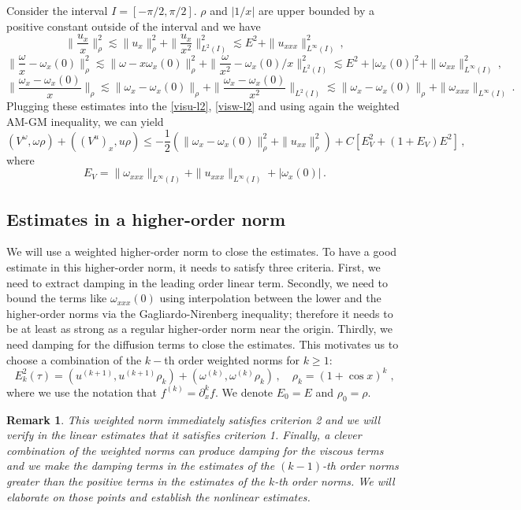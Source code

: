 \documentclass[12pt]{caltech_thesis}
\newtheorem{remark}[theorem]{Remark}
\numberwithin{equation}{section}
\begin{document}
   Consider the interval $I=[-\pi/2,\pi/2]$. $\rho$ and $|1/x|$ are upper bounded by a positive constant outside of the interval and we have $$\|\frac{u_x}{x}\|_{\rho}^2\lesssim \|{u_x}\|_{\rho}^2+\|\frac{u_x}{x^2}\|_{L^2(I)}^2\lesssim E^2+\|u_{xxx}\|_{L^\infty(I)}^2\,,$$
   $$\|\frac{\omega}{x}-\omega_{x}(0)\|_{\rho}^2\lesssim \|\omega-x\omega_{x}(0)\|_{\rho}^2+\|\frac{\omega}{x^2}-\omega_{x}(0)/x\|_{L^2(I)}^2\lesssim E^2+|\omega_{x}(0)|^2+\|\omega_{xx}\|_{L^\infty(I)}^2\,,$$
   $$\|\frac{\omega_{x}-\omega_{x}(0)}{x}\|_{\rho}\lesssim\|{\omega_{x}-\omega_{x}(0)}\|_{\rho}+\|\frac{\omega_{x}-\omega_{x}(0)}{x^2}\|_{L^2(I)}\lesssim\|{\omega_{x}-\omega_{x}(0)}\|_{\rho}+\|\omega_{xxx}\|_{L^\infty(I)}\,.$$
   Plugging these estimates into the \eqref{visu-l2}, \eqref{visw-l2} and using again the weighted AM-GM inequality, we can yield 
   \begin{equation}\label{visuw-l2}(V^\omega,\omega\rho)+((V^u)_x,u\rho)
   \leq -\frac{1}{2}(\|\omega_{x}-\omega_{x}(0)\|^2_{\rho}+\|u_{xx}\|^2_{\rho})+C[E_V^2 +(1+E_V)E^2]\,, 
\end{equation}
where $$E_V=\|\omega_{xxx}\|_{L^\infty(I)}+\|u_{xxx}\|_{L^\infty(I)}+|\omega_{x}(0)|\,.$$

   \subsection{Estimates in a higher-order norm}
    We will use a weighted higher-order norm to close the estimates. To have a good estimate in this higher-order norm, it needs to satisfy three criteria. First, we need to extract damping in the leading order linear term. Secondly, we need to bound the terms like $\omega_{xxx}(0)$ using interpolation between the lower and the higher-order norms via the Gagliardo-Nirenberg inequality; therefore it needs to be at least as strong as a regular higher-order norm near the origin. Thirdly, we need damping for the diffusion terms to close the estimates. This motivates us to choose a combination of the $k-$th order weighted norms for $k\geq1$:
    $$E_{k}^2(\tau)=(u^{(k+1)},u^{(k+1)}\rho_k)+(\omega^{(k)},\omega^{(k)}\rho_k)\,, \quad \rho_k=(1+\cos x)^k\;,$$
    where we use the notation that $f^{(k)}=\partial_x^k f$. We denote $E_0=E$ and $\rho_0=\rho$.
    \begin{remark}
    \label{remark rm}
        This weighted norm immediately satisfies criterion 2 and we will verify in the linear estimates that it satisfies criterion 1. Finally, a clever combination of the weighted norms can produce damping for the viscous terms and we make the damping terms in the estimates of the $(k-1)$-th order norms greater than the positive terms in the estimates of the $k$-th order norms. We will elaborate on those points and establish the nonlinear estimates.
    \end{remark}
    
\end{document}
